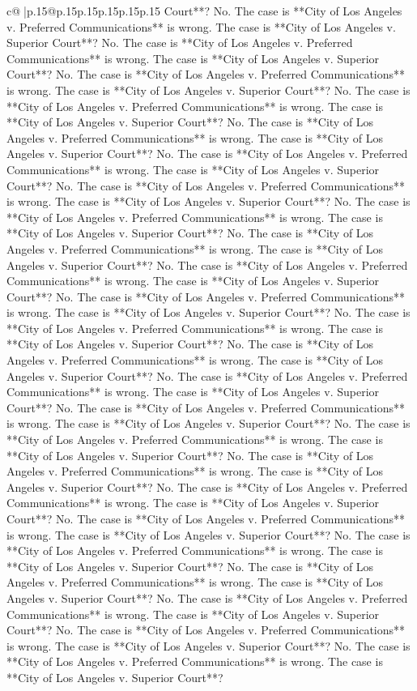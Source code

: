 \documentclass{article}
\begin{document}
{\begin{supertabular}{c@{$\;$}|p{.15\linewidth}@{}p{.15\linewidth}p{.15\linewidth}p{.15\linewidth}p{.15\linewidth}p{.15\linewidth}}
{{{Court**? No. The case is **City of Los Angeles v. Preferred Communications** is wrong. The case is **City of Los Angeles v. Superior Court**? No. The case is **City of Los Angeles v. Preferred Communications** is wrong. The case is **City of Los Angeles v. Superior Court**? No. The case is **City of Los Angeles v. Preferred Communications** is wrong. The case is **City of Los Angeles v. Superior Court**? No. The case is **City of Los Angeles v. Preferred Communications** is wrong. The case is **City of Los Angeles v. Superior Court**? No. The case is **City of Los Angeles v. Preferred Communications** is wrong. The case is **City of Los Angeles v. Superior Court**? No. The case is **City of Los Angeles v. Preferred Communications** is wrong. The case is **City of Los Angeles v. Superior Court**? No. The case is **City of Los Angeles v. Preferred Communications** is wrong. The case is **City of Los Angeles v. Superior Court**? No. The case is **City of Los Angeles v. Preferred Communications** is wrong. The case is **City of Los Angeles v. Superior Court**? No. The case is **City of Los Angeles v. Preferred Communications** is wrong. The case is **City of Los Angeles v. Superior Court**? No. The case is **City of Los Angeles v. Preferred Communications** is wrong. The case is **City of Los Angeles v. Superior Court**? No. The case is **City of Los Angeles v. Preferred Communications** is wrong. The case is **City of Los Angeles v. Superior Court**? No. The case is **City of Los Angeles v. Preferred Communications** is wrong. The case is **City of Los Angeles v. Superior Court**? No. The case is **City of Los Angeles v. Preferred Communications** is wrong. The case is **City of Los Angeles v. Superior Court**? No. The case is **City of Los Angeles v. Preferred Communications** is wrong. The case is **City of Los Angeles v. Superior Court**? No. The case is **City of Los Angeles v. Preferred Communications** is wrong. The case is **City of Los Angeles v. Superior Court**? No. The case is **City of Los Angeles v. Preferred Communications** is wrong. The case is **City of Los Angeles v. Superior Court**? No. The case is **City of Los Angeles v. Preferred Communications** is wrong. The case is **City of Los Angeles v. Superior Court**? No. The case is **City of Los Angeles v. Preferred Communications** is wrong. The case is **City of Los Angeles v. Superior Court**? No. The case is **City of Los Angeles v. Preferred Communications** is wrong. The case is **City of Los Angeles v. Superior Court**? No. The case is **City of Los Angeles v. Preferred Communications** is wrong. The case is **City of Los Angeles v. Superior Court**? No. The case is **City of Los Angeles v. Preferred Communications** is wrong. The case is **City of Los Angeles v. Superior Court**? No. The case is **City of Los Angeles v. Preferred Communications** is wrong. The case is **City of Los Angeles v. Superior Court**? No. The case is **City of Los Angeles v. Preferred Communications** is wrong. The case is **City of Los Angeles v. Superior Court**? No. The case is **City of Los Angeles v. Preferred Communications** is wrong. The case is **City of Los Angeles v. Superior Court**? }}}
\end{supertabular}}
\end{document}
